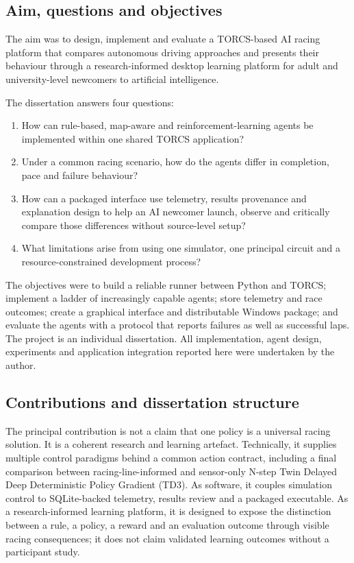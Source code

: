 \subsection{Aim, questions and objectives}

The aim was to design, implement and evaluate a TORCS-based AI racing platform that compares autonomous driving approaches and presents their behaviour through a research-informed desktop learning platform for adult and university-level newcomers to artificial intelligence.

The dissertation answers four questions:
\begin{enumerate}[label=\arabic*.]
  \item How can rule-based, map-aware and reinforcement-learning agents be implemented within one shared TORCS application?
  \item Under a common racing scenario, how do the agents differ in completion, pace and failure behaviour?
  \item How can a packaged interface use telemetry, results provenance and explanation design to help an AI newcomer launch, observe and critically compare those differences without source-level setup?
  \item What limitations arise from using one simulator, one principal circuit and a resource-constrained development process?
\end{enumerate}

The objectives were to build a reliable runner between Python and TORCS; implement a ladder of increasingly capable agents; store telemetry and race outcomes; create a graphical interface and distributable Windows package; and evaluate the agents with a protocol that reports failures as well as successful laps. The project is an individual dissertation. All implementation, agent design, experiments and application integration reported here were undertaken by the author.

\subsection{Contributions and dissertation structure}

The principal contribution is not a claim that one policy is a universal racing solution. It is a coherent research and learning artefact. Technically, it supplies multiple control paradigms behind a common action contract, including a final comparison between racing-line-informed and sensor-only N-step Twin Delayed Deep Deterministic Policy Gradient (TD3). As software, it couples simulation control to SQLite-backed telemetry, results review and a packaged executable. As a research-informed learning platform, it is designed to expose the distinction between a rule, a policy, a reward and an evaluation outcome through visible racing consequences; it does not claim validated learning outcomes without a participant study.

